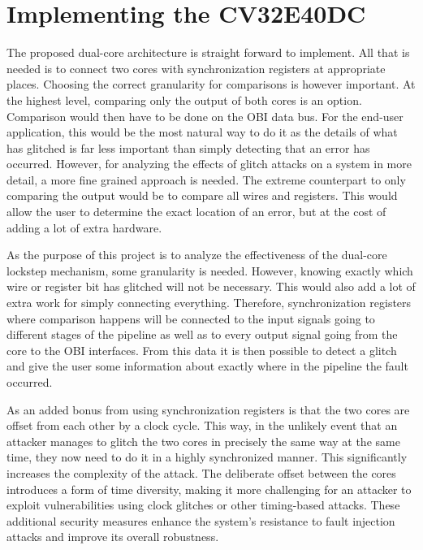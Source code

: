 \section{Implementing the CV32E40DC}
\label{sec:dualcore}

The proposed dual-core architecture is straight forward to implement. All that is needed is to connect two cores with synchronization registers at appropriate places. Choosing the correct granularity for comparisons is however important. At the highest level, comparing only the output of both cores is an option. Comparison would then have to be done on the OBI data bus. For the end-user application, this would be the most natural way to do it as the details of what has glitched is far less important than simply detecting that an error has occurred. However, for analyzing the effects of glitch attacks on a system in more detail, a more fine grained approach is needed. The extreme counterpart to only comparing the output would be to compare all wires and registers. This would allow the user to determine the exact location of an error, but at the cost of adding a lot of extra hardware. 


As the purpose of this project is to analyze the effectiveness of the dual-core lockstep mechanism, some granularity is needed. However, knowing exactly which wire or register bit has glitched will not be necessary. This would also add a lot of extra work for simply connecting everything. Therefore, synchronization registers where comparison happens will be connected to the input signals going to different stages of the pipeline as well as to every output signal going from the core to the OBI interfaces. From this data it is then possible to detect a glitch and give the user some information about exactly where in the pipeline the fault occurred.

As an added bonus from using synchronization registers is that the two cores are offset from each other by a clock cycle. This way, in the unlikely event that an attacker manages to glitch the two cores in precisely the same way at the same time, they now need to do it in a highly synchronized manner. This significantly increases the complexity of the attack. The deliberate offset between the cores introduces a form of time diversity, making it more challenging for an attacker to exploit vulnerabilities using clock glitches or other timing-based attacks. These additional security measures enhance the system's resistance to fault injection attacks and improve its overall robustness.

